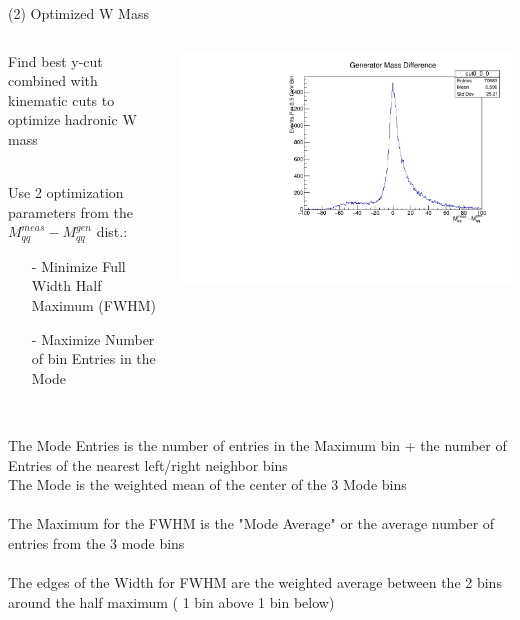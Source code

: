 \documentclass[10pt]{beamer}
\begin{document}
\begin{frame}{(2) Optimized W Mass}
\begin{columns}
\begin{column}{0.5\textwidth}
Find best y-cut combined with kinematic cuts to optimize hadronic W mass\

\quad \quad \\
Use 2 optimization parameters from the $M_{qq}^{meas} - M_{qq}^{gen}$ dist.:\\
\begin{itemize}
\item[-]Minimize Full Width Half Maximum (FWHM) \\
\item[-]Maximize Number of bin Entries in the Mode\\
\end{itemize}
\end{column}
\begin{column}{0.5\textwidth}
\includegraphics[scale=0.3]{nocutDiff.pdf}\\
\end{column}
\end{columns}
\quad \quad \\ 
\scriptsize
The Mode Entries is the number of entries in the Maximum bin + the number of Entries of the nearest left/right neighbor bins\\
The Mode is the weighted mean of the center of the 3 Mode bins\\
\quad \quad \\ 
The Maximum for the FWHM is the "Mode Average" or the average number of entries from the 3 mode bins\\
\quad \quad \\ 
The edges of the Width for FWHM are the weighted average between the 2 bins around the half maximum ( 1 bin above 1 bin below) 
\end{frame}
\end{document}
